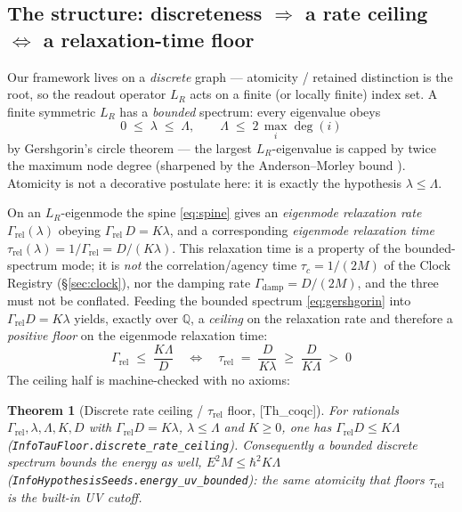 \documentclass[10pt,twocolumn]{article}
\newtheorem{theorem}{Theorem}
\theoremstyle{definition}
\newcommand{\Thq}{\textsf{[Th\_coqc]}}
\newcommand{\code}[1]{\texttt{#1}}
\newcommand{\LR}{L_{R}}
\begin{document}
\subsection{The structure: discreteness $\Rightarrow$ a rate ceiling $\Leftrightarrow$
  a relaxation-time floor}\label{sec:pred-structure}

Our framework lives on a \emph{discrete} graph --- atomicity / retained distinction is the
root, so the readout operator $\LR$ acts on a finite (or locally finite) index set. A
finite symmetric $\LR$ has a \emph{bounded} spectrum: every eigenvalue obeys
\begin{equation}\label{eq:gershgorin}
0 \;\le\; \lambda \;\le\; \Lambda,\qquad
\Lambda \;\le\; 2\,\max_i \deg(i)
\end{equation}
by Gershgorin's circle theorem \cite{gershgorin1931} --- the largest $\LR$-eigenvalue is
capped by twice the maximum node degree (sharpened by the Anderson--Morley bound
\cite{andersonmorley1985}). Atomicity is not a decorative postulate here: it is exactly the
hypothesis $\lambda\le\Lambda$.

On an $\LR$-eigenmode the spine \eqref{eq:spine} gives an \emph{eigenmode relaxation rate}
$\Gamma_{\mathrm{rel}}(\lambda)$ obeying $\Gamma_{\mathrm{rel}}\, D = K\lambda$, and a corresponding
\emph{eigenmode relaxation time} $\tau_{\mathrm{rel}}(\lambda) = 1/\Gamma_{\mathrm{rel}} = D/(K\lambda)$.
This relaxation time is a property of the bounded-spectrum mode; it is \emph{not} the
correlation/agency time $\tau_c=1/(2M)$ of the Clock Registry (\S\ref{sec:clock}), nor the
damping rate $\Gamma_{\mathrm{damp}}=D/(2M)$, and the three must not be conflated. Feeding the
bounded spectrum \eqref{eq:gershgorin} into $\Gamma_{\mathrm{rel}} D = K\lambda$ yields, exactly
over $\mathbb{Q}$, a \emph{ceiling} on the relaxation rate and therefore a \emph{positive floor}
on the eigenmode relaxation time:
\begin{equation}\label{eq:floor}
\boxed{\;\Gamma_{\mathrm{rel}} \;\le\; \frac{K\Lambda}{D}
\quad\Longleftrightarrow\quad
\tau_{\mathrm{rel}} \;=\; \frac{D}{K\lambda}\;\ge\;\frac{D}{K\Lambda}\;>\;0\;}
\end{equation}
The ceiling half is machine-checked with no axioms:

\begin{theorem}[Discrete rate ceiling / $\tau_{\mathrm{rel}}$ floor, \Thq{}]\label{thm:ceiling}
For rationals $\Gamma_{\mathrm{rel}},\lambda,\Lambda,K,D$ with $\Gamma_{\mathrm{rel}} D = K\lambda$, $\lambda\le\Lambda$
and $K\ge 0$, one has $\Gamma_{\mathrm{rel}} D \le K\Lambda$
\emph{(\code{InfoTauFloor.discrete\_rate\_ceiling})}. Consequently a bounded discrete
spectrum bounds the energy as well, $E^2M \le \hbar^2 K\Lambda$
\emph{(\code{InfoHypothesisSeeds.energy\_uv\_bounded})}: the same atomicity that floors
$\tau_{\mathrm{rel}}$ is the built-in UV cutoff.
\end{theorem}
\end{document}
